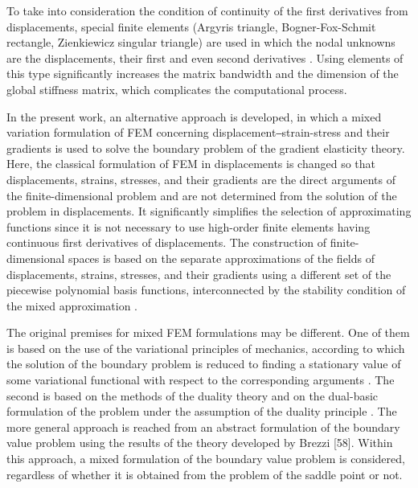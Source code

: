 To take into consideration the condition of continuity of the first derivatives from displacements, special finite elements (Argyris triangle, Bogner-Fox-Schmit rectangle, Zienkiewicz singular triangle) are used in which the nodal unknowns are the displacements, their first and even second derivatives \cite{Chirkov37, Chirkov47, Chirkov52}. Using elements of this type significantly increases the matrix bandwidth and the dimension of the global stiffness matrix, which complicates the computational process.

In the present work, an alternative approach is developed, in which a mixed variation formulation of FEM concerning displacement‒strain-stress and their gradients is used to solve the boundary problem of the gradient elasticity theory. Here, the classical formulation of FEM in displacements is changed so that displacements, strains, stresses, and their gradients are the direct arguments of the finite-dimensional problem and are not determined from the solution of the problem in displacements. It significantly simplifies the selection of approximating functions since it is not necessary to use high-order finite elements having continuous first derivatives of displacements. The construction of finite-dimensional spaces is based on the separate approximations of the fields of displacements, strains, stresses, and their gradients using a different set of the piecewise polynomial basis functions, interconnected by the stability condition of the mixed approximation \cite{Chirkov39, Chirkov40, Chirkov41, Chirkov42}.

The original premises for mixed FEM formulations may be different. One of them is based on the use of the variational principles of mechanics, according to which the solution of the boundary problem is reduced to finding a stationary value of some variational functional with respect to the corresponding arguments \cite{Chirkov54, Chirkov55, Chirkov56}. The second is based on the methods of the duality theory and on the dual-basic formulation of the problem under the assumption of the duality principle \cite{Chirkov51, Chirkov54, Chirkov57}. The more general approach is reached from an abstract formulation of the boundary value problem using the results of the theory developed by Brezzi [58]. Within this approach, a mixed formulation of the boundary value problem is considered, regardless of whether it is obtained from the problem of the saddle point or not.

